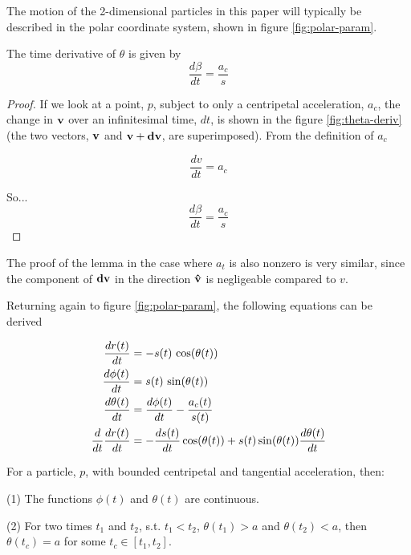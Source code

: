 The motion of the 2-dimensional particles in this paper will typically be described in the polar coordinate system, shown in figure \ref{fig:polar-param}.


\begin{lemma}
The time derivative of $\theta$ is given by
\[
\frac{d\beta}{dt} = \frac{a_c}{s}
\]
\end{lemma}

\begin{proof}


If we look at a point, $p$, subject to only a centripetal acceleration, $a_c$, the change in $\mathbf{v}$ over an infinitesimal time, $dt$, is shown in the figure \ref{fig:theta-deriv} (the two vectors, $\mathbf{v}$ and $\mathbf{v}+\mathbf{dv}$, are superimposed). From the definition of $a_c$

\[
\frac{dv}{dt} = a_c
\]

So...
\[
\frac{d\beta}{dt} = \frac{a_c}{s}
\]
\end{proof}

The proof of the lemma in the case where $a_t$ is also nonzero is very similar, since the component of $\mathbf{dv}$ in the direction $\mathbf{\hat{v}}$ is negligeable compared to $v$.

Returning again to figure \ref{fig:polar-param}, the following equations can be derived

\begin{align}
  \frac{dr(t)}{dt}& = -s(t) \, \cos\paren{\theta(t)}\\
  \frac{d\phi(t)}{dt}& = s(t) \, \sin\paren{\theta(t)}\\
  \frac{d\theta(t)}{dt}& = \frac{d\phi(t)}{dt} - \frac{a_c(t)}{s(t)}\label{eq:theta-deriv}\\
  \frac{d}{dt} \frac{dr(t)}{dt}& = -\frac{ds(t)}{dt} \cos\paren{\theta(t)} + s(t) \sin\paren{\theta(t)} \frac{d\theta(t)}{dt}
\end{align}

\begin{lemma}
  For a particle, $p$, with bounded centripetal and tangential acceleration, then: 

  (1) The functions $\phi(t)$ and $\theta(t)$ are continuous. 

  (2) For two times $t_1$ and $t_2$, s.t. $t_1 < t_2$, $\theta(t_1) > a$ and $\theta(t_2) < a$, then $\theta(t_c) = a$ for some $t_c \in [t_1, t_2]$.
\end{lemma}

